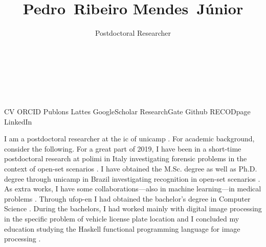 

\title{Pedro~Ribeiro Mendes~Júnior}

\author{Postdoctoral Researcher\\%
  \\%
  \\%
  \\%
  \\%
}
\date{}



\maketitle

\begin{tags}
  \gls{CV}
  \gls{ORCID}
  \gls{Publons}
  \gls{Lattes}
  \gls{GoogleScholar}
  \gls{ResearchGate}
  \gls{Github}
  \gls{RECODpage}
  \gls{LinkedIn}
\end{tags}

I am a postdoctoral researcher at the \gls{ic} of \gls{unicamp} .
For academic background, consider the following.
For a great part of 2019, I have been in a short-time postdoctoral research at \gls{polimi} in Italy investigating forensic problems in the context of open-set scenarios .
I have obtained the M.Sc. degree  as well as Ph.D. degree  through \gls{unicamp} in Brazil investigating recognition in open-set scenarios .
As extra works, I have some collaborations---also in machine learning---in medical problems .
Through \gls{ufop-en} I had obtained the bachelor's degree in Computer Science .
During the bachelors, I had worked mainly with digital image processing in the specific problem of vehicle license plate location  and I concluded my education studying the Haskell functional programming language for image processing .

